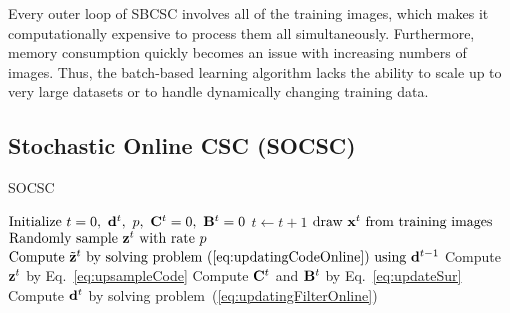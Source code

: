 Every outer loop of SBCSC involves all of the training images, which
makes it computationally expensive to process them all simultaneously.
Furthermore, memory consumption quickly becomes an issue with
increasing numbers of images. Thus, the batch-based learning algorithm
lacks the ability to scale up to very large datasets or to handle
dynamically changing training data.


\subsection{Stochastic Online CSC (SOCSC)}

\begin{algorithm}[H]
\caption{SOCSC} \label{algo:SOCSC}
\begin{algorithmic}[1]
\State $\text{Initialize} ~ t=0, ~\filter^t, ~p, ~\surC^t = 0, ~\surB^t = 0$
    \State $t \gets t+1$
    \State $ \text{draw } \signal^t \text{ from training images} $
    \State $ \text{Randomly sample }\code^t \text{ with rate } p $
    \State $ \text{Compute } \subcode^t \text{ by solving problem~(\ref{eq:updatingCodeOnline}) using } \filter^{t-1}$
    \State Compute $\code^t$ by Eq.~\ref{eq:upsampleCode}
    \State Compute $\surC^t$ and $\surB^t$ by Eq.~\ref{eq:updateSur}
    \State Compute $\filter^t$ by solving problem~(\ref{eq:updatingFilterOnline})
\EndWhile
\end{algorithmic}
\end{algorithm}

